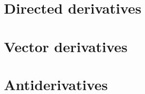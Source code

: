 \documentclass[a4paper,12pt]{article}
\begin{document}
\section{Directed derivatives}

\section{Vector derivatives}

\section{Antiderivatives}


\printbibliography[heading=bibintoc, title={References}]
\end{document}
